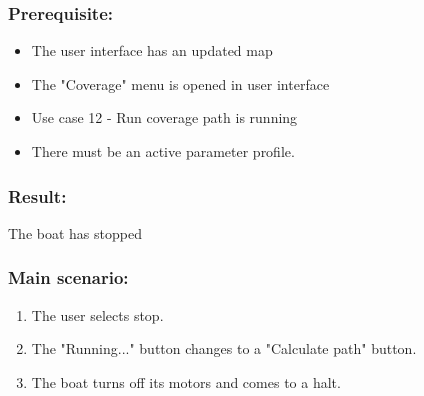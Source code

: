 \subsubsection*{Prerequisite:}
\begin{itemize}
	\item The user interface has an updated map
	\item The "Coverage" menu is opened in user interface
	\item Use case 12 - Run coverage path is running
	\item There must be an active parameter profile.
	
\end{itemize}

\subsubsection*{Result:}
The boat has stopped

\subsubsection*{Main scenario:}
\begin{enumerate}
	\item The user selects stop.
	\item The "Running..." button changes to a "Calculate path" button.
	\item The boat turns off its motors and comes to a halt.
\end{enumerate}	





